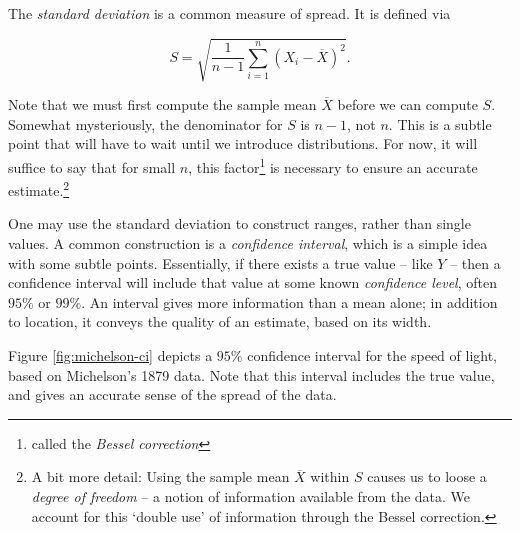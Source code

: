 \documentclass[../primer.tex]{subfiles}
\begin{document}
The \emph{standard deviation} is a common measure of spread. It is defined via

\begin{equation} \label{eq:def-sample-sd}
  S = \sqrt{\frac{1}{n-1}\sum_{i=1}^n (X_i - \overline{X})^2}.
\end{equation}

Note that we must first compute the sample mean $\overline{X}$ before we can
compute $S$. Somewhat mysteriously, the denominator for $S$ is $n-1$, not $n$.
This is a subtle point that will have to wait until we introduce distributions.
For now, it will suffice to say that for small $n$, this factor\footnote{called
  the \emph{Bessel correction}} is necessary to ensure an accurate
estimate.\footnote{A bit more detail: Using the sample mean $\overline{X}$
  within $S$ causes us to loose a \emph{degree of freedom} -- a notion of
  information available from the data. We account for this `double use' of
  information through the Bessel correction.}

One may use the standard deviation to construct ranges, rather than single
values. A common construction is a \emph{confidence
  interval}, which is a simple idea with some subtle points. Essentially, if
there exists a true value -- like $Y$ -- then a confidence interval will include
that value at some known \emph{confidence level}, often $95\%$ or $99\%$. An
interval gives more information than a mean alone; in addition to location, it
conveys the quality of an estimate, based on its width.

Figure \ref{fig:michelson-ci} depicts a $95\%$ confidence interval for the speed
of light, based on Michelson's 1879 data. Note that this interval includes the
true value, and gives an accurate sense of the spread of the data.
\end{document}
